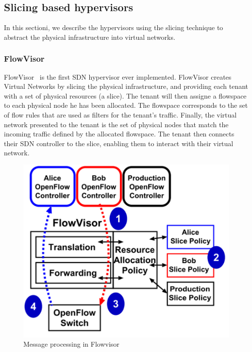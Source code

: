 \subsection{Slicing based hypervisors}
\label{sec:existing-nhv}
In this sectioni, we describe the hypervisors using the slicing technique to abstract the physical infrastructure into virtual networks.

\subsubsection{FlowVisor}

FlowVisor~\cite{FlowVisor-Sherwood2009} is the first SDN hypervisor ever implemented.
FlowVisor creates Virtual Networks by slicing the physical infrastructure, and providing each tenant with a set of physical resources (\ie a slice).
The tenant will then assigne a flowspace to each physical node he has been allocated.
The flowspace corresponds to the set of flow rules that are used as filters for the tenant's traffic.
Finally, the virtual network presented to the tenant is the set of physical nodes that match the incoming traffic defined by the allocated flowspace.
The tenant then connects their SDN controller to the slice, enabling them to interact with their virtual network.



\begin{figure}[h]
    \centering
    \includegraphics[scale=0.6]{figures/flowvisor-process.pdf}
    \caption{Message processing in Flowvisor~\cite{FlowVisor-Sherwood2009}}
    \label{fig:flowvisor-process}
\end{figure}

